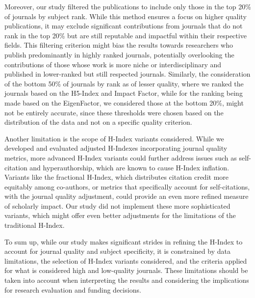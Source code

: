 Moreover, our study filtered the publications to include only those in the top
20\% of journals by subject rank. While this method ensures a focus on
higher quality publications, it may exclude significant contributions from
journals that do not rank in the top 20\% but are still reputable and impactful
within their respective fields. This filtering criterion might bias the results
towards researchers who publish predominantly in highly ranked journals,
potentially overlooking the contributions of those whose work is more niche or
interdisciplinary and published in lower-ranked but still respected journals.
Similarly, the consideration of the bottom 50\% of journals by rank as of
lesser quality, where we ranked the journals based on the H5-Index and Impact
Factor, while for the ranking being made based on the EigenFactor, we
considered those at the bottom 20\%, might not be entirely accurate, since
these thresholds were chosen based on the distribution of the data and not on a
specific quality criterion. %

Another limitation is the scope of H-Index variants considered. While we
developed and evaluated adjusted H-Indexes incorporating journal quality
metrics, more advanced H-Index variants could further address issues such as
self-citation and hyperauthorship, which are known to cause H-Index inflation.
Variants like the fractional H-Index, which distributes citation credit more
equitably among co-authors, or metrics that specifically account for
self-citations, with the journal quality adjustment, could provide an even more
refined measure of scholarly impact. Our study did not implement these more
sophisticated variants, which might offer even better adjustments for the
limitations of the traditional H-Index.

To sum up, while our study makes significant strides in refining the H-Index to
account for journal quality and subject specificity, it is constrained by data
limitations, the selection of H-Index variants considered, and the
criteria applied for what is considered high and low-quality journals. These
limitations should be taken into account when interpreting the results and
considering the implications for research evaluation and funding decisions.
